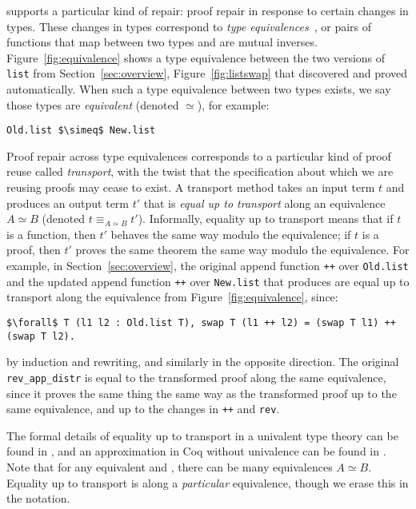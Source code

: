 \toolname supports a particular kind of repair: proof repair in response to certain changes in types.
These changes in types correspond to \textit{type equivalences}~\cite{univalent2013homotopy},
or pairs of functions that map between two types and are mutual inverses.
Figure~\ref{fig:equivalence} shows a type equivalence between the two versions of \lstinline{list}
from Section~\ref{sec:overview}, Figure~\ref{fig:listswap} that \toolname discovered and proved automatically.
When such a type equivalence between two types exists, we say those types are \textit{equivalent} (denoted $\simeq$), for example:

\begin{lstlisting}
Old.list $\simeq$ New.list
\end{lstlisting}

Proof repair across type equivalences corresponds to a particular kind of proof reuse called \textit{transport},
with the twist that the specification about which we are reusing proofs may cease to exist.
A transport method takes an input term $t$ and produces an output term $t'$ that is \textit{equal up to transport}
along an equivalence $A \simeq B$ (denoted $t \equiv_{A \simeq B} t'$).
Informally, equality up to transport means that if $t$ is a function, then $t'$ behaves the same way modulo the equivalence;
if $t$ is a proof, then $t'$ proves the same theorem the same way modulo the equivalence.
For example, in Section~\ref{sec:overview}, the original append function \lstinline{++} over \lstinline{Old.list}
and the updated append function \lstinline{++} over \lstinline{New.list} that \toolname produces are
equal up to transport along the equivalence from Figure~\ref{fig:equivalence}, since:

\begin{lstlisting}
$\forall$ T (l1 l2 : Old.list T), swap T (l1 ++ l2) = (swap T l1) ++ (swap T l2).
\end{lstlisting}
by induction and rewriting, and similarly in the opposite direction.
The original \lstinline{rev_app_distr} is equal to the transformed proof along the same equivalence,
since it proves the same thing the same way as the transformed proof up to the same equivalence, and up to the changes in \lstinline{++}
and \lstinline{rev}.

The formal details of equality up to transport in a univalent type theory can be found in \citet{univalent2013homotopy}, and an approximation in Coq without univalence can be found in \citet{tabareau2017equivalences}.
Note that for any equivalent \A and \B, there can be many equivalences $A \simeq B$.
Equality up to transport is along a \textit{particular} equivalence, though we erase this in the notation.

